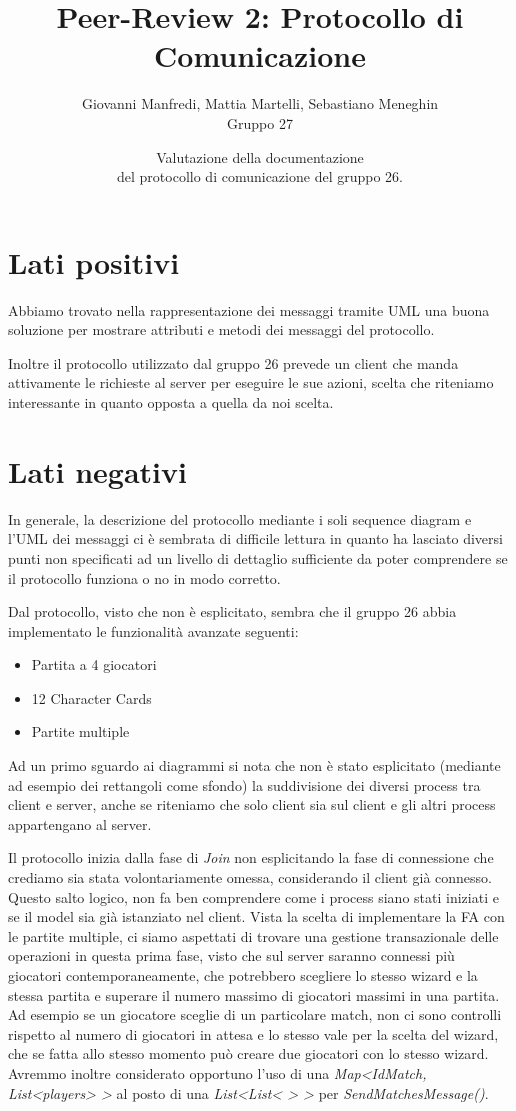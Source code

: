 \documentclass[12pt]{article}
\title{Peer-Review 2: Protocollo di Comunicazione}
\author{Giovanni Manfredi, Mattia Martelli, Sebastiano Meneghin\\Gruppo 27}
\date{Valutazione della documentazione \\del protocollo di comunicazione del gruppo 26.}
\begin{document}
	
	\maketitle
	
	\thispagestyle{empty}
	
	\section*{Lati positivi}
	
	Abbiamo trovato nella rappresentazione dei messaggi tramite UML una buona soluzione per mostrare attributi e metodi dei messaggi del protocollo.
	
	Inoltre il protocollo utilizzato dal gruppo 26 prevede un client che manda attivamente le richieste al server per eseguire le sue azioni, scelta che riteniamo interessante in quanto opposta a quella da noi scelta.
	
	\section*{Lati negativi}
	
	In generale, la descrizione del protocollo mediante i soli sequence diagram e l’UML dei messaggi ci è sembrata di difficile lettura in quanto ha lasciato diversi punti non specificati ad un livello di dettaglio sufficiente da poter comprendere se il protocollo funziona o no in modo corretto.
	
	Dal protocollo, visto che non è esplicitato, sembra che il gruppo 26 abbia implementato le funzionalità avanzate seguenti:
	\begin{itemize}
		\item Partita a 4 giocatori
		\item 12 Character Cards
		\item Partite multiple
	\end{itemize}
	Ad un primo sguardo ai diagrammi si nota che non è stato esplicitato (mediante ad esempio dei rettangoli come sfondo) la suddivisione dei diversi process tra client e server, anche se riteniamo che solo client sia sul client e gli altri process appartengano al server.
	
	Il protocollo inizia dalla fase di \emph{Join} non esplicitando la fase di connessione che crediamo sia stata volontariamente omessa, considerando il client già connesso. Questo salto logico, non fa ben comprendere come i process siano stati iniziati e se il model sia già istanziato nel client. 
	Vista la scelta di implementare la FA con le partite multiple, ci siamo aspettati di trovare una gestione transazionale delle operazioni in questa prima fase, visto che sul server saranno connessi più giocatori contemporaneamente, che potrebbero scegliere lo stesso wizard e la stessa partita e superare il numero massimo di giocatori massimi in una partita. Ad esempio se un giocatore sceglie di un particolare match, non ci sono controlli rispetto al numero di giocatori in attesa e lo stesso vale per la scelta del wizard, che se fatta allo stesso momento può creare due giocatori con lo stesso wizard.
	Avremmo inoltre considerato opportuno l’uso di una \emph{Map<IdMatch, List<players> >} al posto di una \emph{List<List< > >} per \emph{SendMatchesMessage()}.
	
\end{document}
